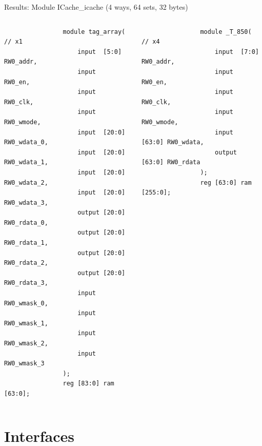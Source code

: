 \documentclass[]{beamer} %
\newenvironment{fullpage}[0]{%
	\begin{list}{}{%
		\setlength{\leftmargin}{-7mm}%
		\setlength{\rightmargin}{-7mm}%
		\vspace*{-10pt}
		}%
\item[]}{\end{list}}
\begin{document}
\begin{frame}[fragile,t]{Results: Module ICache\_icache (4 ways, 64 sets, 32 bytes)}
	\begin{fullpage}
	\begin{columns}
		\begin{minipage}[t][\textheight][l]{\linewidth}
			\begin{verbatim}
				module tag_array( // x1
					input  [5:0] RW0_addr,
					input   RW0_en,
					input   RW0_clk,
					input   RW0_wmode,
					input  [20:0] RW0_wdata_0,
					input  [20:0] RW0_wdata_1,
					input  [20:0] RW0_wdata_2,
					input  [20:0] RW0_wdata_3,
					output [20:0] RW0_rdata_0,
					output [20:0] RW0_rdata_1,
					output [20:0] RW0_rdata_2,
					output [20:0] RW0_rdata_3,
					input   RW0_wmask_0,
					input   RW0_wmask_1,
					input   RW0_wmask_2,
					input   RW0_wmask_3
				);
				reg [83:0] ram [63:0];
			\end{verbatim}
		\end{minipage}
		\begin{minipage}[t][\textheight][l]{\linewidth}
			\begin{verbatim}
				module _T_850( // x4
					input  [7:0] RW0_addr,
					input   RW0_en,
					input   RW0_clk,
					input   RW0_wmode,
					input  [63:0] RW0_wdata,
					output [63:0] RW0_rdata
				);
				reg [63:0] ram [255:0];
			\end{verbatim}
		\end{minipage}
	\end{columns}
	\end{fullpage}
\end{frame}




\section{Interfaces}
\end{document}
